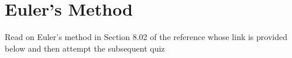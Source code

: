 \section{Euler's Method}

\activities
Read on Euler's method in Section 8.02 of the reference whose link is provided below and then attempt the subsequent quiz
\begin{activity}[\cg Reading]
\end{activity}


